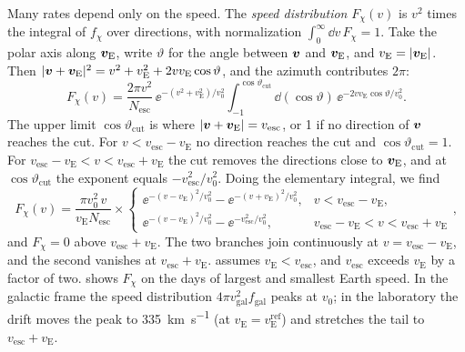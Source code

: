 Many rates depend only on the speed. The \emph{speed distribution} $F_\chi(v)$ is $v^2$ times the integral of $f_\chi$ over directions, with normalization $\int_0^\infty \dd v\, F_\chi = 1$. Take the polar axis along $\bm{v}_{\mathrm{E}}$, write $\vartheta$ for the angle between $\bm{v}$ and $\bm{v}_{\mathrm{E}}$, and $v_{\mathrm{E}} = |\bm{v}_{\mathrm{E}}|$. Then $|\bm{v} + \bm{v}_{\mathrm{E}}|^2 = v^2 + v_{\mathrm{E}}^2 + 2 v v_{\mathrm{E}} \cos\vartheta$, and the azimuth contributes $2\pi$:
\begin{equation*}
  F_\chi(v) = \frac{2\pi v^2}{N_{\mathrm{esc}}}\, \ee^{-(v^2 + v_{\mathrm{E}}^2)/v_0^2} \int_{-1}^{\cos\vartheta_{\mathrm{cut}}} \dd (\cos\vartheta)\, \ee^{-2 v v_{\mathrm{E}} \cos\vartheta/v_0^2}.
\end{equation*}
The upper limit $\cos\vartheta_{\mathrm{cut}}$ is where $|\bm{v} + \bm{v}_{\mathrm{E}}| = v_{\mathrm{esc}}$, or 1 if no direction of $\bm{v}$ reaches the cut. For $v < v_{\mathrm{esc}} - v_{\mathrm{E}}$ no direction reaches the cut and $\cos\vartheta_{\mathrm{cut}} = 1$. For $v_{\mathrm{esc}} - v_{\mathrm{E}} < v < v_{\mathrm{esc}} + v_{\mathrm{E}}$ the cut removes the directions close to $\bm{v}_{\mathrm{E}}$, and at $\cos\vartheta_{\mathrm{cut}}$ the exponent equals $-v_{\mathrm{esc}}^2/v_0^2$. Doing the elementary integral, we find
\begin{equation}
  F_\chi(v) = \frac{\pi v_0^2\, v}{v_{\mathrm{E}} N_{\mathrm{esc}}} \times
  \begin{cases}
    \ee^{-(v - v_{\mathrm{E}})^2/v_0^2} - \ee^{-(v + v_{\mathrm{E}})^2/v_0^2}, & v < v_{\mathrm{esc}} - v_{\mathrm{E}},\\[2pt]
    \ee^{-(v - v_{\mathrm{E}})^2/v_0^2} - \ee^{-v_{\mathrm{esc}}^2/v_0^2}, & v_{\mathrm{esc}} - v_{\mathrm{E}} < v < v_{\mathrm{esc}} + v_{\mathrm{E}}
  \end{cases},
  \label{eq:1.2-Fspeed}
\end{equation}
and $F_\chi = 0$ above $v_{\mathrm{esc}} + v_{\mathrm{E}}$. The two branches join continuously at $v = v_{\mathrm{esc}} - v_{\mathrm{E}}$, and the second vanishes at $v_{\mathrm{esc}} + v_{\mathrm{E}}$.  assumes $v_{\mathrm{E}} < v_{\mathrm{esc}}$, and $v_{\mathrm{esc}}$ exceeds $v_{\mathrm{E}}$ by a factor of two.  shows $F_\chi$ on the days of largest and smallest Earth speed. In the galactic frame the speed distribution $4\pi v_{\mathrm{gal}}^2 f_{\mathrm{gal}}$ peaks at $v_0$; in the laboratory the drift moves the peak to \SI{335}{km.s^{-1}} (at $v_{\mathrm{E}} = v_{\mathrm{E}}^{\mathrm{ref}}$) and stretches the tail to $v_{\mathrm{esc}} + v_{\mathrm{E}}$.


